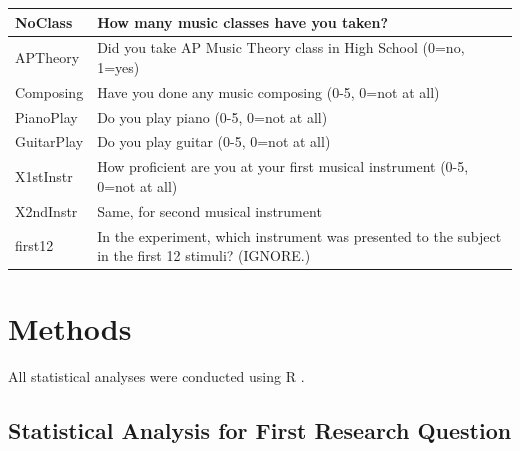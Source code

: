 \documentclass{article}
\begin{document}
\begin{table}
\begin{tabular}{| P{5cm} | m{10.8cm} |}
\hline
NoClass & How many music classes have you taken? \\
\hline
APTheory & Did you take AP Music Theory class in High School (0=no, 1=yes) \\
\hline
Composing & Have you done any music composing (0-5, 0=not at all) \\
\hline
PianoPlay & Do you play piano (0-5, 0=not at all) \\
\hline
GuitarPlay & Do you play guitar (0-5, 0=not at all) \\
\hline
X1stInstr & How proficient are you at your first musical instrument (0-5, 0=not at all) \\
\hline
X2ndInstr & Same, for second musical instrument \\
\hline
first12 & In the experiment, which instrument was presented to the subject in the first 12 stimuli? (IGNORE.) \\
\hline

\end{tabular}
\end{table}


\section{Methods}




All statistical analyses were conducted using R \parencite{r}. 

\subsection{Statistical Analysis for First Research Question}
\end{document}
